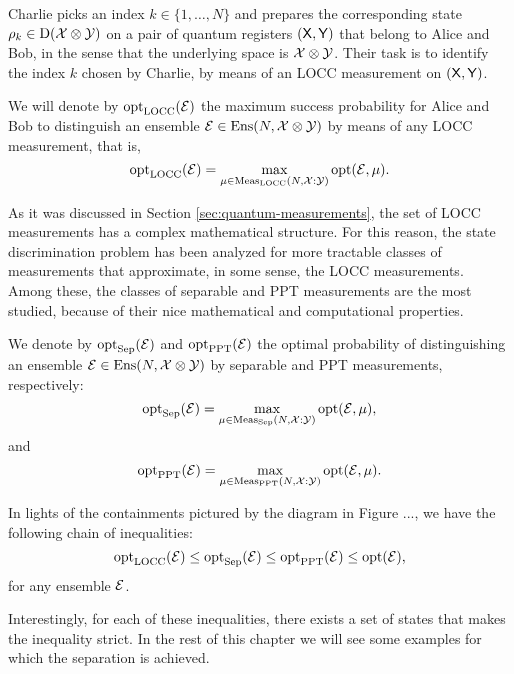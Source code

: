 Charlie picks an index $k \in \{1, \ldots, N\}$ and prepares the corresponding 
state $\rho_{k} \in \mathrm{D}(\mathcal{X}\otimes\mathcal{Y})$ on a pair of quantum registers 
$(\mathsf{X},\mathsf{Y})$ that belong to Alice and Bob, in the sense that the 
underlying space is $\mathcal{X}\otimes\mathcal{Y}$.
Their task is to identify the index $k$ chosen by Charlie, by means of an LOCC 
measurement on $(\mathsf{X},\mathsf{Y})$.

We will denote by $\operatorname{opt}_{\mathrm{LOCC}}(\mathcal{E})$ the maximum success probability for
Alice and Bob to distinguish an ensemble $\mathcal{E}\in\mathrm{Ens}(N, \mathcal{X}\otimes\mathcal{Y})$ by means of 
any LOCC measurement, that is, 
\begin{equation}
\label{eq:opt-LOCC}
  \operatorname{opt}_{\mathrm{LOCC}}(\mathcal{E}) = \max_{\mu \in \mathrm{Meas}_{\mathrm{LOCC}}(N, \mathcal{X}:\mathcal{Y})}\operatorname{opt}(\mathcal{E}, \mu).
\end{equation}

As it was discussed in Section \ref{sec:quantum-measurements}, the set of 
LOCC measurements has a complex mathematical structure.
For this reason, the state discrimination problem has been analyzed for more 
tractable classes of measurements that approximate, in some sense, 
the LOCC measurements.
Among these, the classes of separable and PPT measurements are the most studied,
because of their nice mathematical and computational properties.

We denote by $\operatorname{opt}_{\mathrm{Sep}}(\mathcal{E})$ and $\operatorname{opt}_{\mathrm{PPT}}(\mathcal{E})$ the optimal probability of
distinguishing an ensemble 
$
  \mathcal{E} \in \mathrm{Ens}(N, \mathcal{X}\otimes\mathcal{Y})
$ 
by separable and PPT measurements, respectively:
\begin{equation}
\label{eq:opt-Sep}
  \operatorname{opt}_{\mathrm{Sep}}(\mathcal{E}) = \max_{\mu \in \mathrm{Meas}_{\mathrm{Sep}}(N, \mathcal{X}:\mathcal{Y})}\operatorname{opt}(\mathcal{E}, \mu),
\end{equation}
and
\begin{equation}
\label{eq:opt-PPT}
  \operatorname{opt}_{\mathrm{PPT}}(\mathcal{E}) = \max_{\mu \in \mathrm{Meas}_{\mathrm{PPT}}(N, \mathcal{X}:\mathcal{Y})}\operatorname{opt}(\mathcal{E}, \mu).
\end{equation}


In lights of the containments pictured by the diagram in Figure ...,
we have the following chain of inequalities:  
\begin{equation}
\label{eq:inequality-chain}
  \operatorname{opt}_{\mathrm{LOCC}}(\mathcal{E}) \leq \operatorname{opt}_{\mathrm{Sep}}(\mathcal{E}) \leq \operatorname{opt}_{\mathrm{PPT}}(\mathcal{E}) \leq \operatorname{opt}(\mathcal{E}),
\end{equation}
for any ensemble $\mathcal{E}$.

Interestingly, for each of these inequalities, there exists a set of states 
that makes the inequality strict.
In the rest of this chapter we will see some examples for which the separation 
is achieved.  

